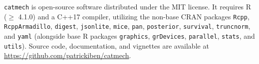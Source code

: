 \documentclass[
]{article}
\begin{document}
\texttt{catmech} is open-source software distributed under the MIT
license. It requires R (\(\ge\) 4.1.0) and a C++17 compiler, utilizing
the non-base CRAN packages \texttt{Rcpp}, \texttt{RcppArmadillo},
\texttt{digest}, \texttt{jsonlite}, \texttt{mice}, \texttt{pan},
\texttt{posterior}, \texttt{survival}, \texttt{truncnorm}, and
\texttt{yaml} (alongside base R packages \texttt{graphics},
\texttt{grDevices}, \texttt{parallel}, \texttt{stats}, and
\texttt{utils}). Source code, documentation, and vignettes are available
at \url{https://github.com/patrickiben/catmech}.

\renewcommand\refname{References}

\end{document}
